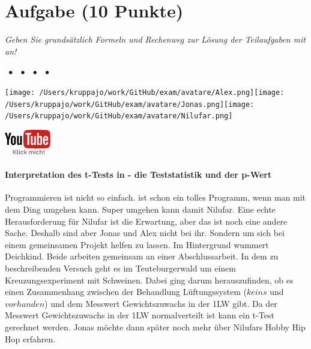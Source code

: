 \documentclass[a4paper, 9pt]{scrartcl}\usepackage[]{graphicx}\usepackage[]{xcolor}
\begin{document}
\section{Aufgabe \hfill (10 Punkte)}

\textit{Geben Sie grundsätzlich Formeln und Rechenweg zur Lösung der Teilaufgaben mit an!} \\[1Ex]
 

 
\ifcollection
\begin{flushright}
\tiny\vspace{-3Ex}
\textbf{\examinhaltstart}
\exammodulemathstat $\;\bullet$
\exammodulestat $\;\bullet$
\exammodulestatbbv $\;\bullet$
\exammodulestatversuch $\;\bullet$
\exammodulebiostat
\vspace{-4Ex}
\end{flushright}
\begin{minipage}[t]{0.5\textwidth}
\texttt{[image: /Users/kruppajo/work/GitHub/exam/avatare/Alex.png]}\hspace{-4mm}\texttt{[image: /Users/kruppajo/work/GitHub/exam/avatare/Jonas.png]}\hspace{-4mm}\texttt{[image: /Users/kruppajo/work/GitHub/exam/avatare/Nilufar.png]}
\end{minipage}
\begin{minipage}[t]{0.5\textwidth}
\hfill
\href{https://youtu.be/exDo7AyHl4Q}{\includegraphics[width = 2cm]{img/youtube}}
\end{minipage}
\fi



\ifcollection
\paragraph{Interpretation des t-Tests in \Rlogo - die Teststatistik und der p-Wert}
\fi

Programmieren ist nicht so einfach. \Rlogo ist schon ein tolles Programm, wenn man mit dem Ding umgehen kann. Super umgehen kann damit Nilufar. Eine echte Herausforderung für Nilufar ist die Erwartung, aber das ist noch eine andere Sache. Deshalb sind aber Jonas und Alex nicht bei ihr. Sondern um sich bei einem gemeinsamen Projekt helfen zu lassen. Im Hintergrund wummert Deichkind. Beide arbeiten gemeinsam an einer Abschlussarbeit. In dem zu beschreibenden Versuch geht es im Teuteburgerwald um einem Kreuzungsexperiment mit Schweinen. Dabei ging darum herauszufinden, ob es einen Zusammenhang zwischen der Behandlung Lüftungssystem ($keins$ und $vorhanden$) und dem Messwert Gewichtszuwachs in der 1LW gibt. Da der Messwert Gewichtszuwachs in der 1LW normalverteilt ist kann ein t-Test gerechnet werden. Jonas möchte dann später noch mehr über Nilufars Hobby Hip Hop erfahren.
\end{document}
